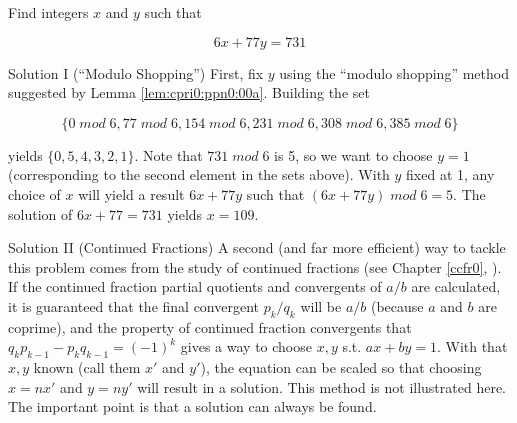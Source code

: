 \begin{vworkexamplestatement}
\label{ex:cpri0:ppn0:01}
Find integers $x$ and $y$ such that

\begin{equation}
6 x + 77 y = 731
\end{equation}
\end{vworkexamplestatement}
\begin{vworkexampleparsection}{Solution I (``Modulo Shopping'')}
First, fix $y$ using the ``modulo shopping'' method
suggested by Lemma \ref{lem:cpri0:ppn0:00a}.  Building
the set

\begin{equation}
\{   0 \; mod \; 6,  77 \; mod \; 6, 154 \; mod \; 6, 
   231 \; mod \; 6, 308 \; mod \; 6, 385 \; mod \; 6 \}
\end{equation}

yields $\{ 0, 5, 4, 3, 2, 1  \}$.  Note that $731 \; mod \; 6$
is 5, so we want to choose $y=1$ (corresponding to the second
element in the sets above).  With $y$ fixed at 1, any choice
of $x$ will yield a result $6x + 77y$ such that
$(6x + 77y) \; mod \; 6 = 5$.  The solution of
$6x + 77 = 731$ yields $x=109$.
\end{vworkexampleparsection}
\begin{vworkexampleparsection}{Solution II (Continued Fractions)}
A second (and far more efficient) way to tackle this problem 
comes from the study of
continued fractions 
(see Chapter \ref{ccfr0}, 
\emph{\ccfrzeroshorttitle{}}).  If the continued fraction
partial quotients and convergents of $a/b$ are calculated,
it is guaranteed that the final convergent $p_k/q_k$ will be $a/b$
(because $a$ and $b$ are coprime), and the property of 
continued fraction convergents that 
$q_k p_{k-1} - p_k q_{k-1} = (-1)^k$ gives a way to choose
$x, y$ s.t. $ax + by = 1$.  With that $x,y$ known (call them
$x'$ and $y'$), the equation can be scaled so that 
choosing $x=nx'$ and $y=ny'$ will result in a solution.
This method is not illustrated here.  The important point is
that a solution can always be found.
\end{vworkexampleparsection}

